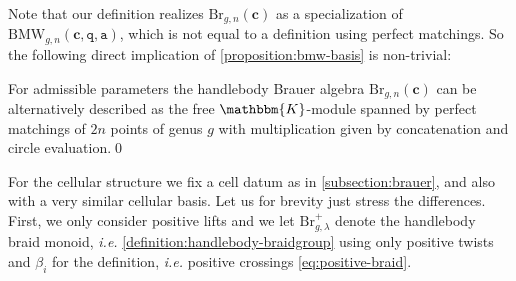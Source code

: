 \documentclass[a4paper,11pt]{amsart}
\newcommand{\ie}{\textsl{i.e.}}
\newcommand{\setstuff}[1]{\mathrm{#1}}
\newcommand{\KK}{\mathbbm{K}}
\newcommand{\bsym}[1]{\boldsymbol{#1}}
\newcommand{\varsym}[1]{\mathtt{#1}}
\newcommand{\qvar}{\varsym{q}}
\newcommand{\cpar}{\bsym{c}}
\newcommand{\avar}{\varsym{a}}
\numberwithin{equation}{section}
\let\fullref\autoref
\begin{document}
Note that our definition realizes $\setstuff{Br}_{g,n}(\cpar)$ 
as a specialization of $\setstuff{BMW}_{g,n}(\cpar,\qvar,\avar)$, which 
is not equal to a definition using perfect matchings. So the following
direct implication of \fullref{proposition:bmw-basis} is non-trivial:

\begin{proposition}\label{proposition:brauer-good}
For admissible parameters the handlebody 
Brauer algebra $\setstuff{Br}_{g,n}(\cpar)$ can be alternatively 
described as the free $\KK$-module spanned by 
perfect matchings of $2n$ points of genus $g$ with multiplication 
given by concatenation and circle evaluation.\qed
\end{proposition}

For the cellular structure we fix a cell datum as in 
\fullref{subsection:brauer}, and also with a very similar 
cellular basis. Let us for brevity just stress the differences.
First, we only consider positive lifts and we let 
$\setstuff{Br}_{g,\lambda}^{+}$ denote the handlebody braid monoid, {\ie}
\fullref{definition:handlebody-braidgroup} 
using only positive twists and $\beta_{i}$ 
for the definition, {\ie} positive crossings \eqref{eq:positive-braid}.
\end{document}
